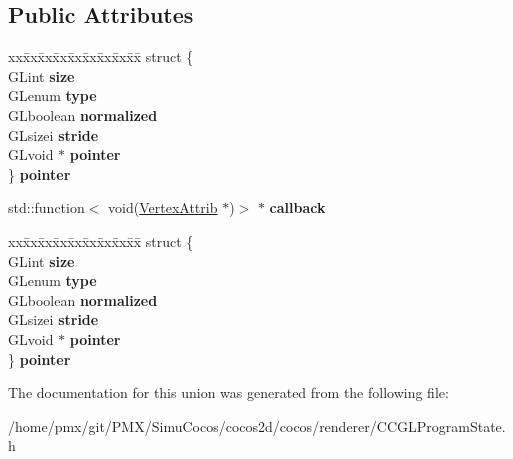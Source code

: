 \subsection*{Public Attributes}
\begin{DoxyCompactItemize}
\item 
\mbox{\label{unionVertexAttribValue_1_1U_a45f092764c4c7045f5df09466b4762aa}} 
\begin{tabbing}
xx\=xx\=xx\=xx\=xx\=xx\=xx\=xx\=xx\=\kill
struct \{\\
\>GLint {\bfseries size}\\
\>GLenum {\bfseries type}\\
\>GLboolean {\bfseries normalized}\\
\>GLsizei {\bfseries stride}\\
\>GLvoid $\ast$ {\bfseries pointer}\\
\} {\bfseries pointer}\\

\end{tabbing}\item 
\mbox{\label{unionVertexAttribValue_1_1U_aadbdfc50378e459e50a514747ee26c88}} 
std\+::function$<$ void(\hyperlink{structVertexAttrib}{Vertex\+Attrib} $\ast$)$>$ $\ast$ {\bfseries callback}
\item 
\mbox{\label{unionVertexAttribValue_1_1U_a3ae387b09e1cca06fb02cd14618bf467}} 
\begin{tabbing}
xx\=xx\=xx\=xx\=xx\=xx\=xx\=xx\=xx\=\kill
struct \{\\
\>GLint {\bfseries size}\\
\>GLenum {\bfseries type}\\
\>GLboolean {\bfseries normalized}\\
\>GLsizei {\bfseries stride}\\
\>GLvoid $\ast$ {\bfseries pointer}\\
\} {\bfseries pointer}\\

\end{tabbing}\end{DoxyCompactItemize}


The documentation for this union was generated from the following file\+:\begin{DoxyCompactItemize}
\item 
/home/pmx/git/\+P\+M\+X/\+Simu\+Cocos/cocos2d/cocos/renderer/C\+C\+G\+L\+Program\+State.\+h\end{DoxyCompactItemize}
